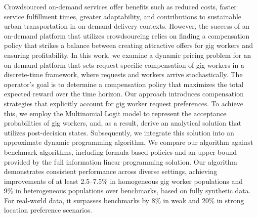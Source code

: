 Crowdsourced on-demand services offer benefits such as reduced costs, faster service fulfillment times, greater adaptability, and contributions to sustainable urban transportation in on-demand delivery contexts. However, the success of an on-demand platform that utilizes crowdsourcing relies on finding a compensation policy that strikes a balance between creating attractive offers for gig workers and ensuring profitability. In this work, we examine a dynamic pricing problem for an on-demand platform that sets request-specific compensation of gig workers in a discrete-time framework, where requests and workers arrive stochastically. The operator's goal is to determine a compensation policy that maximizes the total expected reward over the time horizon. Our approach introduces compensation strategies that explicitly account for gig worker request preferences. To achieve this, we employ the Multinomial Logit model to represent the acceptance probabilities of gig workers, and, as a result, derive an analytical solution that utilizes post-decision states. Subsequently, we integrate this solution into an approximate dynamic programming algorithm. We compare our algorithm against benchmark algorithms, including formula-based policies and an upper bound provided by the full information linear programming solution. Our algorithm demonstrates consistent performance across diverse settings, achieving improvements of at least 2.5–7.5\% in homogeneous gig worker populations and 9\% in heterogeneous populations over benchmarks, based on fully synthetic data. For real-world data, it surpasses benchmarks by 8\% in weak and 20\% in strong location preference scenarios.